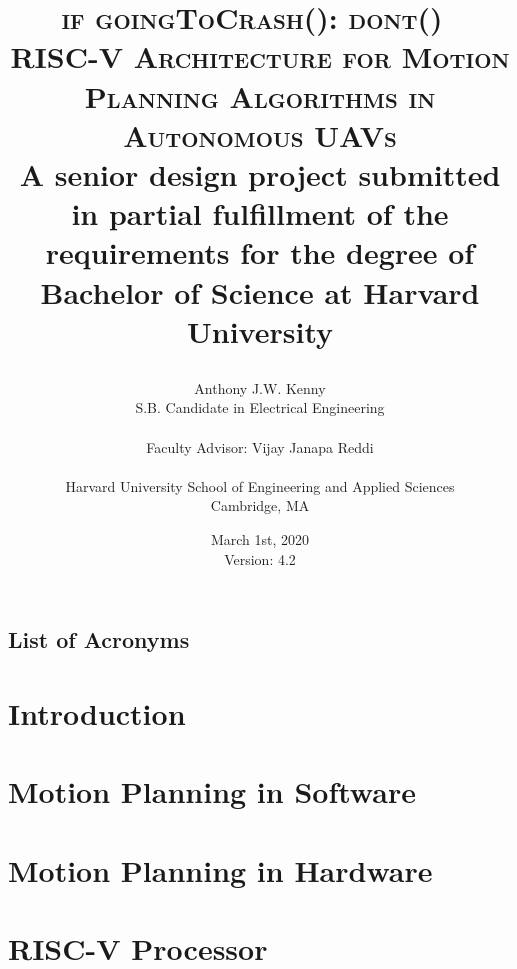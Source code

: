 \documentclass[
    11pt,           %
    letterpaper,    %
    oneside         %
]{report}           %
\title{\textsc{if goingToCrash(): dont()\ \\ RISC-V Architecture for Motion Planning Algorithms in Autonomous UAVs} \\ 
    \bigskip
    \small{A senior design project submitted in partial fulfillment of the requirements for the degree of Bachelor of Science at Harvard University} \\
\author{Anthony J.W. Kenny \\
        \small{S.B. Candidate in Electrical Engineering} \\ \\
        Faculty Advisor: Vijay Janapa Reddi \\ \\
        Harvard University School of Engineering and Applied Sciences \\
        \small{Cambridge, MA}}
\date{March 1st, 2020 \\ 
    \small{Version: 4.2}}}
\begin{document}
\maketitle


    
    \clearpage

    \tableofcontents
    \clearpage

    \section*{List of Acronyms}
    

    \listofalgorithms
 
    \listoffigures

    \listoftables



\chapter{Introduction}
    


\chapter{Motion Planning in Software}
    \label{chap:MotionPlanningInSoftware}
    

\chapter{Motion Planning in Hardware}
    \label{chap:MotionPlanningInHardware}
    

\chapter{RISC-V Processor}
    \label{chap:RiscvProcessor}
    
\end{document}
